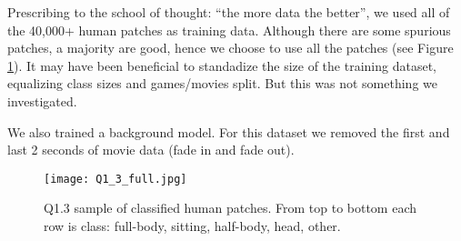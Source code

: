 Prescribing to the school of thought: ``the more data the better'', we used all of the 40,000+ human patches as training data.
Although there are some spurious patches, a majority are good, hence we choose to use all the patches (see Figure \ref{fig:Q1_3}).
It may have been beneficial to standadize the size of the training dataset, equalizing class sizes and games/movies split.
But this was not something we investigated.

We also trained a background model.
For this dataset we removed the first and last 2 seconds of movie data (fade in and fade out).

\begin{figure}[h!]
  \begin{center}
  \texttt{[image: Q1\_3\_full.jpg]}
    \caption{Q1.3 sample of classified human patches. From top to bottom each row is class: full-body, sitting, half-body, head, other.}
    \label{fig:Q1_3}
  \end{center}
  \end{figure}